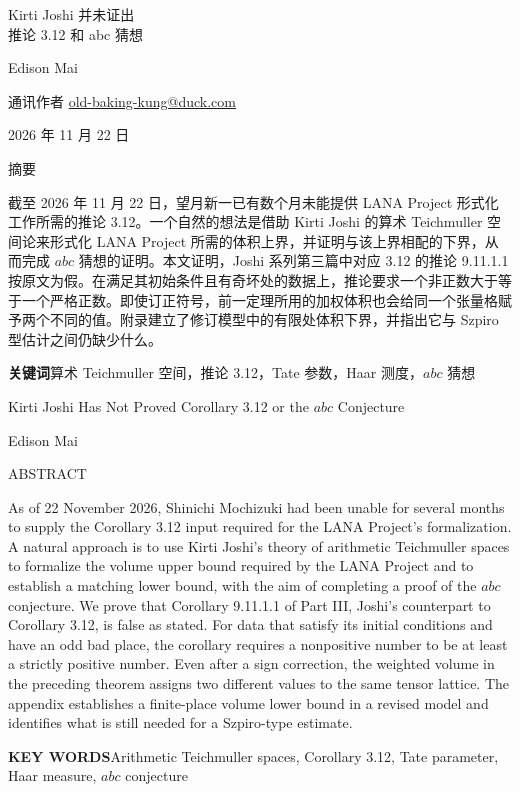 \documentclass[UTF8,fontset=none,zihao=-4,a4paper]{ctexart}
\newcommand\heiti{\CJKfamily{hei}}
\begin{document}
\fontsize{12bp}{20bp}\selectfont
\begin{center}
{\heiti{} Kirti Joshi 并未证出\\推论 3.12 和 abc 猜想\par}
\vspace{12bp}
Edison Mai\par
通讯作者 \href{mailto:old-baking-kung@duck.com}{old-baking-kung@duck.com}\par
2026 年 11 月 22 日
\end{center}
\vspace{24bp}
{\centering\heiti{}\linespread{1}\selectfont 摘要\par}
\vspace{18bp}
\indent 截至 2026 年 11 月 22 日，望月新一已有数个月未能提供 LANA Project 形式化工作所需的推论 3.12。一个自然的想法是借助 Kirti Joshi 的算术 Teichmuller 空间论来形式化 LANA Project 所需的体积上界，并证明与该上界相配的下界，从而完成 \(abc\) 猜想的证明。本文证明，Joshi 系列第三篇中对应 3.12 的推论 9.11.1.1 按原文为假。在满足其初始条件且有奇坏处的数据上，推论要求一个非正数大于等于一个严格正数。即使订正符号，前一定理所用的加权体积也会给同一个张量格赋予两个不同的值。附录建立了修订模型中的有限处体积下界，并指出它与 Szpiro 型估计之间仍缺少什么。
\par\noindent\textbf{关键词}\quad 算术 Teichmuller 空间，推论 3.12，Tate 参数，Haar 测度，\(abc\) 猜想

\newpage
\vspace*{24bp}
{\centering\arial{}\linespread{1}\selectfont Kirti Joshi Has Not Proved Corollary 3.12 or the \(abc\) Conjecture\par}
\vspace{18bp}
{\centering Edison Mai\par}
\vspace{8bp}
{\centering\arial ABSTRACT\par}
\vspace{6bp}
As of 22 November 2026, Shinichi Mochizuki had been unable for several months to supply the Corollary 3.12 input required for the LANA Project's formalization. A natural approach is to use Kirti Joshi's theory of arithmetic Teichmuller spaces to formalize the volume upper bound required by the LANA Project and to establish a matching lower bound, with the aim of completing a proof of the \(abc\) conjecture. We prove that Corollary 9.11.1.1 of Part III, Joshi's counterpart to Corollary 3.12, is false as stated. For data that satisfy its initial conditions and have an odd bad place, the corollary requires a nonpositive number to be at least a strictly positive number. Even after a sign correction, the weighted volume in the preceding theorem assigns two different values to the same tensor lattice. The appendix establishes a finite-place volume lower bound in a revised model and identifies what is still needed for a Szpiro-type estimate.
\par\vfill\noindent\textbf{KEY WORDS}\quad Arithmetic Teichmuller spaces, Corollary 3.12, Tate parameter, Haar measure, \(abc\) conjecture
\end{document}
